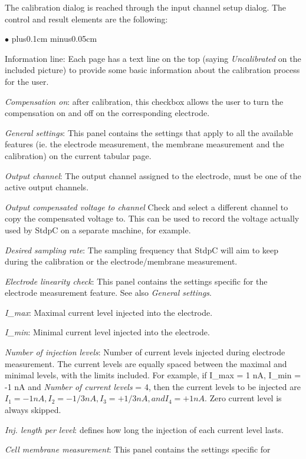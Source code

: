 \documentclass{article}
\newenvironment{myitem}{\begin{list}{$\bullet$}{\setlength{\leftmargin}{1.1em}
\itemsep0.1cm plus0.1cm minus0.05cm
\listparindent0cm
\addtolength{\labelsep}{0.5\labelsep}
\setlength{\labelwidth}{0.8em}
\setlength{\leftmargin}{\labelwidth}
\addtolength{\leftmargin}{\labelsep}
}}{\end{list}}
\begin{document}
The calibration dialog is reached through the input channel setup dialog.
The control and result elements are the following:  
\begin{myitem}
\item Information line: Each page has a text line on the top (saying
  \emph{Uncalibrated} on the included picture) to provide some basic
  information about the calibration process for the user. 
\item \emph{Compensation on}: after calibration, this checkbox allows the
  user to turn the compensation on and off on the corresponding electrode.
\item \emph{General settings}: This panel contains the settings that
  apply to all the available features (ie. the electrode measurement, the
  membrane measurement and the calibration) on the current tabular page.
\item \emph{Output channel}: The output channel assigned to the
  electrode, must be one of the active output channels.
\item \emph{Output compensated voltage to channel} Check and select a different
  channel to copy the compensated voltage to. This can be used to record the
  voltage actually used by StdpC on a separate machine, for example.
\item \emph{Desired sampling rate}: The sampling frequency that StdpC will
  aim to keep during the calibration or the electrode/membrane measurement.
\item \emph{Electrode linearity check}: This panel contains the settings specific for
  the electrode measurement feature. See also \emph{General settings}.
\item \emph{I\_max}: Maximal current level injected into the electrode.
\item \emph{I\_min}: Minimal current level injected into the electrode.
\item \emph{Number of injection levels}: Number of current levels
  injected during electrode measurement. The current levels are equally
  spaced between the maximal and minimal levels, with the limits
  included. For example, if I\_max = 1 nA, I\_min = -1 nA and \emph{Number of
  current levels} = 4, then the current levels to be injected are $I_1 =
  -1 nA, I_2 = -1/3 nA, I_3 = +1/3 nA, and I_4 = +1 nA$. Zero current level
  is always skipped.
\item \emph{Inj. length per level}: defines how long the injection of each
  current level lasts. 
\item \emph{Cell membrane measurement}: This panel contains the settings specific for

\end{myitem}
\end{document}

